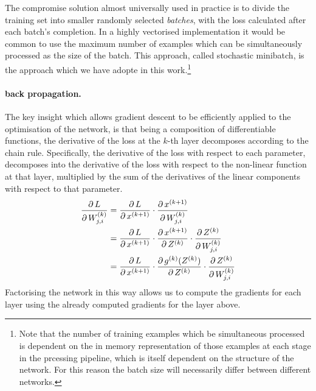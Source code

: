 \documentclass[msc]{infthesis}
\newcommand{\weightedsum}[2][]{Z_{#1}^{(#2)}}
\newcommand{\weights}[2][]{W_{#1}^{(#2)}}
\newcommand{\activation}[2][]{x_{#1}^{(#2)}}
\newcommand{\nonlinearity}[1]{g^{(#1)}}
\begin{document}
The compromise solution almost universally used in practice \cite{Glorot10understandingthe} is to divide the training
set into smaller randomly selected \emph{batches}, with the loss calculated after each batch's
completion.  In a highly vectorised implementation it would be common to use the maximum number
of examples which can be simultaneously processed as the size of the batch.  This approach,
called stochastic minibatch, is the approach which we have adopte in this work.\footnote{ Note
that the number of training examples which be simultaneous processed is dependent on the in
memory representation of those examples at each stage in the prcessing pipeline, which is itself
dependent on the structure of the network.  For this reason the batch size will necessarily
differ between different networks.}


\paragraph*{back propagation.}
The key insight which allows gradient descent to be efficiently applied to the optimisation of the network, is that 
being a composition of differentiable functions, the derivative of the loss at the \(k\)-th layer 
decomposes according to the chain rule. 
%
Specifically, the derivative of the loss with respect to each parameter, decomposes into the derivative 
of the loss with respect to the non-linear function at that layer, multiplied by the sum of the derivatives 
of the linear components with respect to that parameter.
%
\begin{align}
\derivative[ L ]{ \weights[j,i]{k} }
&=
\derivative[ L ]{ \activation{k+1}}
\cdot
\derivative[ \activation{k+1} ]{ \weights[j, i]{k} }
\\
&=
\derivative[ L ]{ \activation{k+1}}
\cdot
\derivative[ \activation{k+1} ]{ \weightedsum{k} }
\cdot
\derivative[ \weightedsum{k} ]{ \weights[j, i]{k} }
\\
&=
\derivative[ L ]{ \activation{k+1}}
\cdot
\derivative[ \nonlinearity{k}( \weightedsum{k} ) ]{ \weightedsum{k} }
\cdot
\derivative[ \weightedsum{k} ]{ \weights[j, i]{k} }
\end{align}
%
Factorising the network in this way allows us to compute the gradients for each layer using the
already computed gradients for the layer above.





\end{document}
